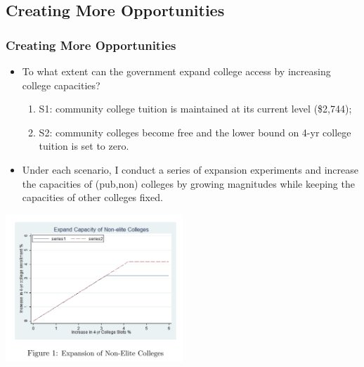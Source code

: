 \documentclass[10pt]{beamer}
\begin{document}
\subsection{Creating More Opportunities}
\begin{frame}[c]\frametitle{Creating More Opportunities}
\begin{itemize}
\item To what extent can the government expand college access by increasing college capacities?
    \begin{enumerate}
        \item S1: community college tuition is maintained at its current level (\$2,744);
        \item S2: community colleges become free and the lower bound on 4-yr college tuition is set to zero.
    \end{enumerate}
\item Under each scenario, I conduct a series of expansion experiments and \alert{increase the capacities of (pub,non) colleges} by growing magnitudes while keeping the capacities of other colleges fixed.
\end{itemize}


\centerline{\includegraphics[width=0.5\textwidth]{figure1.png}}
\end{frame}
\end{document}
